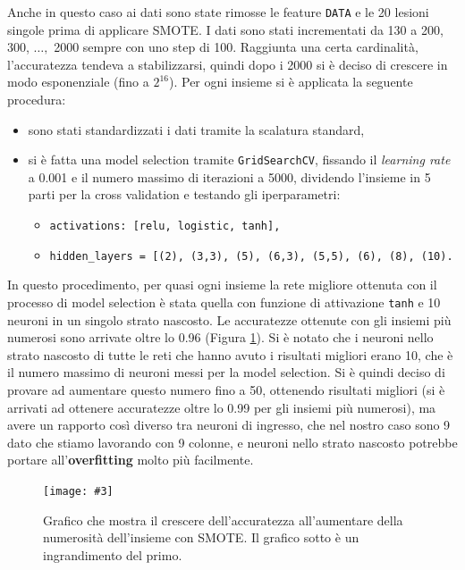 \documentclass[12pt, twoside, letterpaper]{report}
\newcommand{\imgh}[4] {
	\begin{figure}[h]
		\centering
		\texttt{[image: \#3]}\\
		\caption{#1}
		\label{fig:#4}
	\end{figure}
}
\begin{document}
			Anche in questo caso ai dati sono state rimosse le feature \texttt{DATA} e le 20 lesioni singole prima di applicare SMOTE. I dati sono stati incrementati da 130 a 200, 300, $\dots,$ 2000 sempre con uno step di 100. Raggiunta una certa cardinalità, l'accuratezza tendeva a stabilizzarsi, quindi dopo i 2000 si è deciso di crescere in modo esponenziale (fino a $2^{16}$). Per ogni insieme si è applicata la seguente procedura:
				\begin{itemize}
				 \item sono stati standardizzati i dati tramite la scalatura standard,
				 \item si è fatta una model selection tramite \texttt{GridSearchCV}, fissando il \textit{learning rate} a 0.001 e il numero massimo di iterazioni a 5000, dividendo l'insieme in 5 parti per la cross validation e testando gli iperparametri:
				 	\begin{itemize}
					\item \texttt{activations: [relu, logistic, tanh],}
    				\item \texttt{hidden\_layers = [(2), (3,3), (5), (6,3), (5,5), (6), (8), (10).}
					\end{itemize}
				 \end{itemize}
			In questo procedimento, per quasi ogni insieme la rete migliore ottenuta con il processo di model selection è stata quella con funzione di attivazione \texttt{tanh} e 10 neuroni in un singolo strato nascosto. Le accuratezze ottenute con gli insiemi più numerosi sono arrivate oltre lo 0.96 (Figura \ref{fig:accuracy_smote}). Si è notato che i neuroni nello strato nascosto di tutte le reti che hanno avuto i risultati migliori erano 10, che è il numero massimo di neuroni messi per la model selection. Si è quindi deciso di provare ad aumentare questo numero fino a 50, ottenendo risultati migliori (si è arrivati ad ottenere accuratezze oltre lo 0.99 per gli insiemi più numerosi), ma avere un rapporto così diverso tra neuroni di ingresso, che nel nostro caso sono 9 dato che stiamo lavorando con 9 colonne, e neuroni nello strato nascosto potrebbe portare all'\textbf{overfitting} molto più facilmente.
			\imgh{Grafico che mostra il crescere dell'accuratezza all'aumentare della numerosità dell'insieme con SMOTE. Il grafico sotto è un ingrandimento del primo.}{0.35}{accuracy_smote_1.png}{accuracy_smote}
			
\end{document}

